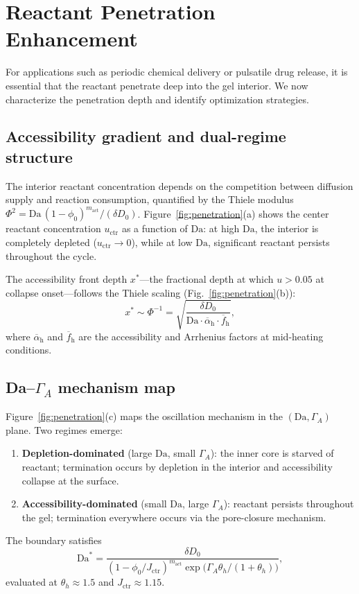 \documentclass[aps,pre,reprint,superscriptaddress,longbibliography,floatfix]{revtex4-2}
\newcommand{\Da}{\mathrm{Da}}
\begin{document}
\section{Reactant Penetration Enhancement}
\label{sec:penetration}

For applications such as periodic chemical delivery or pulsatile drug
release, it is essential that the reactant penetrate deep into the gel
interior. We now characterize the penetration depth and identify
optimization strategies.

\subsection{Accessibility gradient and dual-regime structure}

The interior reactant concentration depends on the competition between
diffusion supply and reaction consumption, quantified by the Thiele
modulus $\Phi^2=\Da\,(1-\phi_0)^{m_\mathrm{act}}/(\delta D_0)$.
Figure~\ref{fig:penetration}(a) shows the center reactant concentration
$u_\mathrm{ctr}$ as a function of $\Da$: at high $\Da$, the interior
is completely depleted ($u_\mathrm{ctr}\to 0$), while at low $\Da$,
significant reactant persists throughout the cycle.

The accessibility front depth $x^*$---the fractional depth at which
$u>0.05$ at collapse onset---follows the Thiele scaling
(Fig.~\ref{fig:penetration}(b)):
\begin{equation}
  x^*\sim\Phi^{-1} = \sqrt{\frac{\delta D_0}{\Da\cdot
  \overline{\alpha}_\mathrm{h}\cdot\overline{f}_\mathrm{h}}},
\end{equation}
where $\overline{\alpha}_\mathrm{h}$ and $\overline{f}_\mathrm{h}$ are
the accessibility and Arrhenius factors at mid-heating conditions.

\subsection{Da--$\Gamma_A$ mechanism map}

Figure~\ref{fig:penetration}(c) maps the oscillation mechanism in the
$(\Da,\Gamma_A)$ plane. Two regimes emerge:
\begin{enumerate}
  \item \textbf{Depletion-dominated} (large $\Da$, small $\Gamma_A$):
    the inner core is starved of reactant; termination occurs by
    depletion in the interior and accessibility collapse at the surface.
  \item \textbf{Accessibility-dominated} (small $\Da$, large
    $\Gamma_A$): reactant persists throughout the gel; termination
    everywhere occurs via the pore-closure mechanism.
\end{enumerate}
The boundary satisfies
\begin{equation}
  \Da^* = \frac{\delta D_0}{(1-\phi_0/J_\mathrm{ctr})^{m_\mathrm{act}}
  \exp\!\bigl(\Gamma_A\theta_h/(1+\theta_h)\bigr)},
\end{equation}
evaluated at $\theta_h\approx 1.5$ and $J_\mathrm{ctr}\approx 1.15$.
\end{document}

